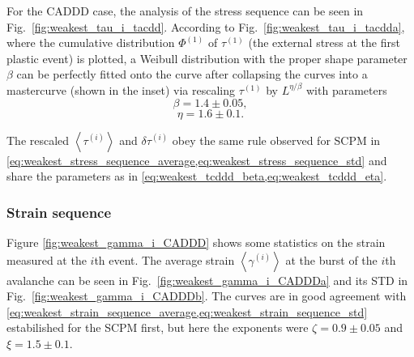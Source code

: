 For the CADDD case, the analysis of the stress sequence can be seen in Fig.~\ref{fig:weakest_tau_i_tacdd}. According to Fig.~\ref{fig:weakest_tau_i_tacdda}, where the cumulative distribution ${\Phi ^{\left( 1 \right)}}$ of ${\tau ^{\left( 1 \right)}}$ (the external stress at the first plastic event) is plotted, a Weibull distribution with the proper shape parameter $\beta$ can be perfectly fitted onto the curve after collapsing the curves into a mastercurve (shown in the inset) via rescaling ${\tau ^{\left( 1 \right)}}$ by ${L^{\eta /\beta }}$ with parameters
\begin{equation} \label{eq:weakest_tcddd_beta}
  \beta  =  1.4 \pm 0.05,
\end{equation}
\begin{equation} \label{eq:weakest_tcddd_eta}
  \eta  =  1.6 \pm 0.1. 
\end{equation}

The rescaled $\left\langle {{\tau ^{\left( i \right)}}} \right\rangle $ and $\delta {\tau ^{\left( i \right)}}$ obey the same rule observed for SCPM in  \cref{eq:weakest_stress_sequence_average,eq:weakest_stress_sequence_std} and share the parameters as in \cref{eq:weakest_tcddd_beta,eq:weakest_tcddd_eta}.



\subsubsection{Strain sequence}

Figure \ref{fig:weakest_gamma_i_CADDD} shows some statistics on the strain measured at the $i$th event. The average strain $\left\langle {{\gamma ^{\left( i \right)}}} \right\rangle $ at the burst of the $i$th avalanche can be seen in Fig.~\ref{fig:weakest_gamma_i_CADDDa} and its STD in Fig.~\ref{fig:weakest_gamma_i_CADDDb}. The curves are in good agreement with \cref{eq:weakest_strain_sequence_average,eq:weakest_strain_sequence_std} estabilished for the SCPM first, but here the exponents were $\zeta  = 0.9 \pm 0.05$ and $\xi  = 1.5 \pm 0.1$.


